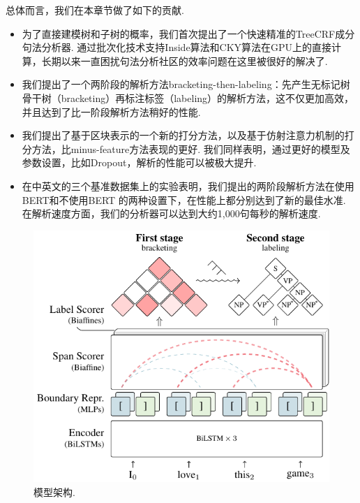 总体而言，我们在本章节做了如下的贡献.
\begin{itemize}
  \item 为了直接建模树和子树的概率，我们首次提出了一个快速精准的TreeCRF成分句法分析器.
        通过批次化技术支持Inside算法和CKY算法在GPU上的直接计算，长期以来一直困扰句法分析社区的效率问题在这里被很好的解决了.

  \item 我们提出了一个两阶段的解析方法bracketing-then-labeling：先产生无标记树骨干树（bracketing）再标注标签（labeling）的解析方法，这不仅更加高效，并且达到了比一阶段解析方法稍好的性能.

  \item 我们提出了基于区块表示的一个新的打分方法，以及基于仿射注意力机制的打分方法，比minus-feature方法表现的更好.
        我们同样表明，通过更好的模型及参数设置，比如Dropout，解析的性能可以被极大提升.

  \item 在中英文的三个基准数据集上的实验表明，我们提出的两阶段解析方法在使用BERT和不使用BERT \citep{devlin-etal-2019-bert}的两种设置下，在性能上都分别达到了新的最佳水准.
        在解析速度方面，我们的分析器可以达到大约1,000句每秒的解析速度.
\end{itemize}

\begin{figure}[tb]
  \centering
  \includegraphics [scale=1.1]{figures/con-framework.pdf}
  \caption{模型架构.}
  \label{fig:con-framework}
\end{figure}


